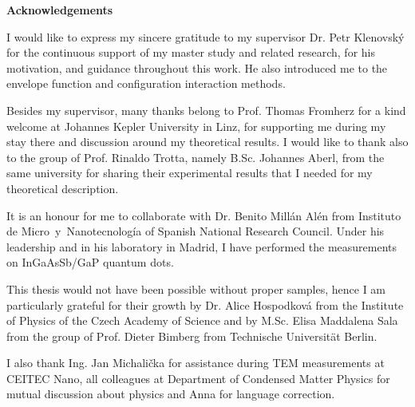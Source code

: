 \documentclass[
a4paper, %
11pt, %
onecolumn, %
openany, %
oldfontcommands,
]{memoir}
\begin{document}
%

\newpage


\noindent\Large\textbf{Acknowledgements}\\ \normalsize

\noindent I would like to express my sincere gratitude to my supervisor Dr. Petr Klenovský for the continuous support of my master study and related research, for his motivation, and guidance throughout this work. He also introduced me to the envelope function and configuration interaction methods. 

Besides my supervisor, many thanks belong to Prof. Thomas Fromherz for a kind welcome at Johannes Kepler University in Linz, for supporting me during my stay there and discussion around my theoretical results. I would like to thank also to the group of Prof. Rinaldo Trotta, namely B.Sc. Johannes Aberl, from the same university for sharing their experimental results that I needed for my theoretical description.

It is an honour for me to collaborate with Dr. Benito Millán Alén from Instituto de Micro~y~Nanotecnología of Spanish National Research Council. Under his leadership and in his laboratory in Madrid, I have performed the measurements on InGaAsSb/GaP quantum dots.


This thesis would not have been possible without proper samples, hence I am particularly grateful for their growth by Dr. Alice Hospodková from the Institute of Physics of the Czech Academy of Science and by M.Sc. Elisa Maddalena Sala from the group of Prof. Dieter Bimberg from Technische Universität Berlin.

I also thank Ing. Jan Michalička for assistance during TEM measurements at CEITEC Nano, all colleagues at Department of Condensed Matter Physics for mutual discussion about physics and Anna for language correction.


\end{document}
